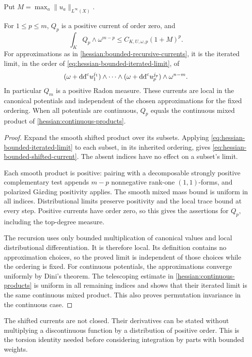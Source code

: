 Put $M=\max_a\|u_a\|_{L^\infty(X)}$.

\begin{theorem}\label{hessian:bounded-shifted-positive}
For $1\leq p\leq m$, $Q_p$ is a positive current of order zero, and
\[
 \int_KQ_p\wedge\omega^{m-p}
       \leq C_{K,U,\omega,p}(1+M)^p.
\]
For approximations as in \cref{hessian:bounded-recursive-currents},
it is the iterated limit, in the order of
\eqref{eq:hessian-bounded-iterated-limit}, of
\[
 (\omega+\mathrm{dd}^{\mathrm{c}} u_1^{j_1})\wedge\cdots\wedge
 (\omega+\mathrm{dd}^{\mathrm{c}} u_p^{j_p})\wedge\omega^{n-m}.
\]
In particular $Q_m$ is a positive Radon measure. These currents are
local in the canonical potentials and independent of the chosen
approximations for the fixed ordering. When all potentials are
continuous, $Q_p$ equals the continuous mixed product of
\cref{hessian:continuous-products}.
\end{theorem}
\begin{proof}
Expand the smooth shifted product over its subsets. Applying
\eqref{eq:hessian-bounded-iterated-limit} to each subset, in its
inherited ordering, gives \eqref{eq:hessian-bounded-shifted-current}.
The absent indices have no effect on a subset's limit.

Each smooth product is positive: pairing with a decomposable
strongly positive complementary test appends $m-p$ nonnegative
rank-one $(1,1)$-forms, and polarized G\aa rding positivity applies.
The smooth mixed mass bound is uniform in all indices. Distributional
limits preserve positivity and the local trace bound at every step.
Positive currents have order zero, so this gives the assertions for
$Q_p$, including the top-degree measure.

The recursion uses only bounded multiplication of canonical values
and local distributional differentiation. It is therefore local.
Its definition contains no approximation choices, so the proved
limit is independent of those choices while the ordering is fixed.
For continuous potentials, the approximations converge uniformly by
Dini's theorem. The telescoping estimate in
\cref{hessian:continuous-products} is uniform in all remaining
indices and shows that their iterated limit is the same continuous
mixed product. This also proves permutation invariance in the
continuous case.
\end{proof}

The shifted currents are not closed. Their derivatives can be stated
without multiplying a discontinuous function by a distribution of
positive order. This is the torsion identity needed before considering
integration by parts with bounded weights.

